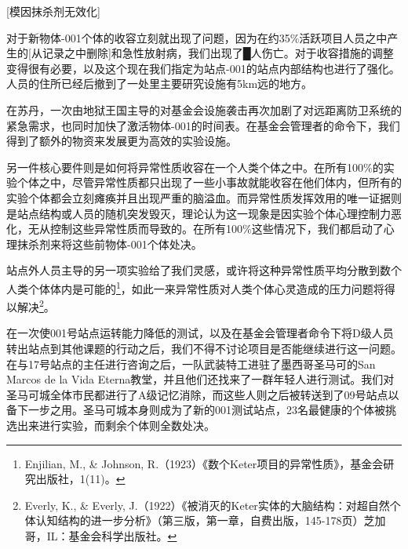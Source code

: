


\begin{scpboxc}
{[模因抹杀剂无效化]}
\end{scpboxc}

\begin{scpboxbbwm}





对于新物体-001个体的收容立刻就出现了问题，因为在约35\%活跃项目人员之中产生的[从记录之中删除]和急性放射病，我们出现了█人伤亡。对于收容措施的调整变得很有必要，以及这个现在我们指定为站点-001的站点内部结构也进行了强化。人员的住所已经后撤到了一处里主要研究设施有5km远的地方。

在苏丹，一次由地狱王国主导的对基金会设施袭击再次加剧了对远距离防卫系统的紧急需求，也同时加快了激活物体-001的时间表。在基金会管理者的命令下，我们得到了额外的物资来发展更为高效的实验设施。

另一件核心要件则是如何将异常性质收容在一个人类个体之中。在所有100\%的实验个体之中，尽管异常性质都只出现了一些小事故就能收容在他们体内，但所有的实验个体都会立刻瘫痪并且出现严重的脑溢血。而异常性质发挥效用的唯一证据则是站点结构或人员的随机突发毁灭，理论认为这一现象是因实验个体心理控制力恶化，无从控制这些异常性质而导致的。在所有100\%这些情况下，我们都启动了心理抹杀剂来将这些前物体-001个体处决。

站点外人员主导的另一项实验给了我们灵感，或许将这种异常性质平均分散到数个人类个体体内是可能的\footnote{Enjilian, M., \& Johnson, R.（1923）《数个Keter项目的异常性质》，基金会研究出版社，1(11)。}，如此一来异常性质对人类个体心灵造成的压力问题将得以解决\footnote{Everly, K., \& Everly, J.（1922）《被消灭的Keter实体的大脑结构：对超自然个体认知结构的进一步分析》（第三版，第一章，自费出版，145-178页）芝加哥，IL：基金会科学出版社。}。

在一次使001号站点运转能力降低的测试，以及在基金会管理者命令下将D级人员转出站点到其他课题的行动之后，我们不得不讨论项目是否能继续进行这一问题。在与17号站点的主任进行咨询之后，一队武装特工进驻了墨西哥圣马可的San Marcos de la Vida Eterna教堂，并且他们还找来了一群年轻人进行测试。我们对圣马可城全体市民都进行了A级记忆消除，而这些人则之后被转送到了09号站点以备下一步之用。圣马可城本身则成为了新的001测试站点，23名最健康的个体被挑选出来进行实验，而剩余个体则全数处决。

\end{scpboxbbwm}

